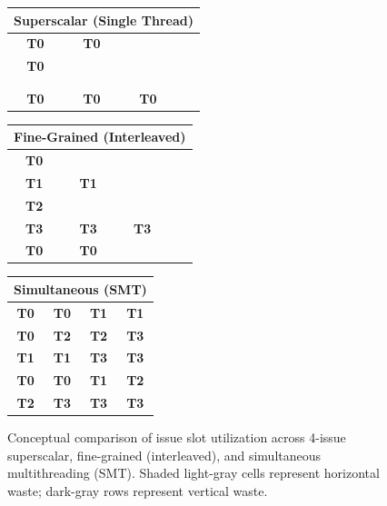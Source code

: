 \begin{figure}[htbp]
  \begin{center}
    \small
    \begin{tabular}{|c|c|c|c|}
      \hline
      \multicolumn{4}{|c|}{\textbf{Superscalar (Single Thread)}} \\ \hline
      \textbf{T0} & \textbf{T0} & \cellcolor{gray!30} & \cellcolor{gray!30} \\ \hline
      \textbf{T0} & \cellcolor{gray!30} & \cellcolor{gray!30} & \cellcolor{gray!30} \\ \hline
      \cellcolor{gray!60} & \cellcolor{gray!60} & \cellcolor{gray!60} & \cellcolor{gray!60} \\ \hline
      \cellcolor{gray!60} & \cellcolor{gray!60} & \cellcolor{gray!60} & \cellcolor{gray!60} \\ \hline
      \textbf{T0} & \textbf{T0} & \textbf{T0} & \cellcolor{gray!30} \\ \hline
    \end{tabular}
    \quad
    \begin{tabular}{|c|c|c|c|}
      \hline
      \multicolumn{4}{|c|}{\textbf{Fine-Grained (Interleaved)}} \\ \hline
      \textbf{T0} & \cellcolor{gray!30} & \cellcolor{gray!30} & \cellcolor{gray!30} \\ \hline
      \textbf{T1} & \textbf{T1} & \cellcolor{gray!30} & \cellcolor{gray!30} \\ \hline
      \textbf{T2} & \cellcolor{gray!30} & \cellcolor{gray!30} & \cellcolor{gray!30} \\ \hline
      \textbf{T3} & \textbf{T3} & \textbf{T3} & \cellcolor{gray!30} \\ \hline
      \textbf{T0} & \textbf{T0} & \cellcolor{gray!30} & \cellcolor{gray!30} \\ \hline
    \end{tabular}
    \quad
    \begin{tabular}{|c|c|c|c|}
      \hline
      \multicolumn{4}{|c|}{\textbf{Simultaneous (SMT)}} \\ \hline
      \textbf{T0} & \textbf{T0} & \textbf{T1} & \textbf{T1} \\ \hline
      \textbf{T0} & \textbf{T2} & \textbf{T2} & \textbf{T3} \\ \hline
      \textbf{T1} & \textbf{T1} & \textbf{T3} & \textbf{T3} \\ \hline
      \textbf{T0} & \textbf{T0} & \textbf{T1} & \textbf{T2} \\ \hline
      \textbf{T2} & \textbf{T3} & \textbf{T3} & \textbf{T3} \\ \hline
    \end{tabular}
    \caption{Conceptual comparison of issue slot utilization across 4-issue superscalar, fine-grained (interleaved), and simultaneous multithreading (SMT). Shaded light-gray cells represent horizontal waste; dark-gray rows represent vertical waste.}
    \label{fig:smt_waste}
  \end{center}
\end{figure}

